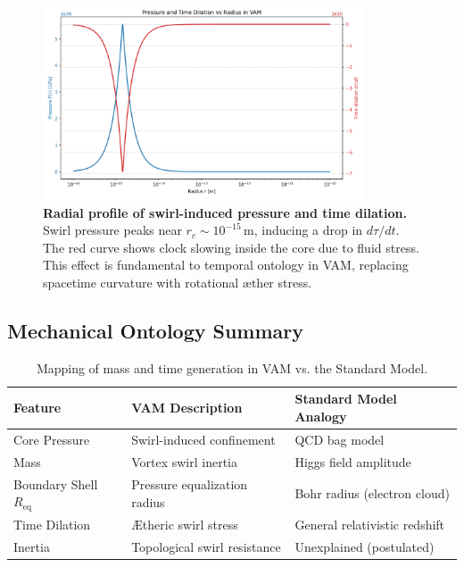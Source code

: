 \begin{figure}[H]
\centering
\includegraphics[width=0.85\textwidth]{images/TimeDilationCore}
\caption{
\textbf{Radial profile of swirl-induced pressure and time dilation.} Swirl pressure peaks near \( r_c \sim 10^{-15} \,\mathrm{m} \), inducing a drop in \( d\tau/dt \). The red curve shows clock slowing inside the core due to fluid stress. This effect is fundamental to temporal ontology in VAM, replacing spacetime curvature with rotational æther stress.
}
\label{fig:time_dilation_profile}
\end{figure}

\subsection{Mechanical Ontology Summary}

\begin{table}[H]
\centering
\small
\renewcommand{\arraystretch}{1.4}
\begin{tabular}{|l|l|l|}
\hline
\textbf{Feature} & \textbf{VAM Description} & \textbf{Standard Model Analogy} \\
\hline
Core Pressure & Swirl-induced confinement & QCD bag model \\
Mass & Vortex swirl inertia & Higgs field amplitude \\
Boundary Shell \( R_{\text{eq}} \) & Pressure equalization radius & Bohr radius (electron cloud) \\
Time Dilation & Ætheric swirl stress & General relativistic redshift \\
Inertia & Topological swirl resistance & Unexplained (postulated) \\
\hline
\end{tabular}
\caption{Mapping of mass and time generation in VAM vs. the Standard Model.}
\end{table}

